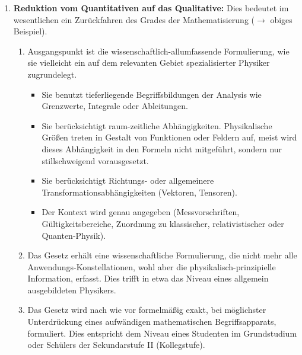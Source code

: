 \begin{enumerate}
	\item \textbf{Reduktion vom Quantitativen auf das Qualitative:} Dies bedeutet im wesentlichen ein Zur\"{u}ckfahren des Grades der Mathematisierung ($\to$ obiges Beispiel).
	
	\begin{enumerate}
		\item
		Ausgangspunkt ist die wissenschaftlich-allumfassende Formulierung,
		wie sie vielleicht ein auf dem relevanten Gebiet spezialisierter
		Physiker zugrundelegt.
		\begin{itemize}
			\item
			Sie benutzt tieferliegende Begriffsbildungen der Analysis wie
			Grenzwerte, Integrale oder Ableitungen.
			
			\item
			Sie ber\"{u}cksichtigt raum-zeitliche Abh\"{a}ngigkeiten.
			Physikalische Gr\"{o}{\ss}en
			treten in Gestalt von Funktionen oder Feldern auf, meist wird
			dieses Abh\"{a}ngigkeit in den Formeln nicht mitgef\"{u}hrt,
			sondern nur stillschweigend vorausgesetzt.
			\item
			Sie ber\"{u}cksichtigt Richtungs- oder allgemeinere
			Trans\-for\-mations\-ab\-h\"{a}ngig\-kei\-ten (Vektoren, Tensoren).
			\item
			Der Kontext wird genau angegeben (Messvorschriften,
			G\"{u}ltigkeitsbereiche, Zuordnung zu klassischer,
			relativistischer oder Quanten-Physik).
		\end{itemize}
		
		\item Das Gesetz erh\"{a}lt eine wissenschaftliche Formulierung,
		die nicht mehr alle An\-wen\-dungs-Kon\-stella\-tio\-nen,
		wohl aber die physikalisch-prinzipielle Information, erfasst.
		Dies trifft in etwa das Niveau eines allgemein ausgebildeten
		Physikers.
		
		\item Das Gesetz wird nach wie vor formelm\"{a}{\ss}ig exakt, bei m\"{o}glichster
		Unterdr\"{u}ckung eines aufw\"{a}ndigen mathematischen
		Begriffsapparats, formuliert.
		Dies entspricht dem Niveau eines Studenten im Grundstudium
		oder Sch\"{u}lers der Sekundarstufe II (Kollegstufe).
		

\end{enumerate}
\end{enumerate}
